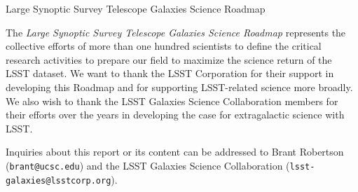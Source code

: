 \documentclass[11pt,fleqn,oneside,openany]{book}
\begin{document}



\thispagestyle{empty}
{\Huge Large Synoptic Survey Telescope} 
\linebreak 
\linebreak 
{\Huge Galaxies Science Roadmap}
\linebreak
\linebreak
{\centering

}
\vfill

\newpage
\thispagestyle{empty}

\noindent
{\justify
The {\it Large Synoptic Survey Telescope Galaxies Science Roadmap} represents the collective efforts of more than one hundred scientists to define the critical research activities to prepare our field to maximize
the science return of the LSST dataset. We want to thank the LSST Corporation for their
support in developing this Roadmap and for supporting LSST-related science more broadly.
We also wish to thank the LSST Galaxies Science Collaboration members for their efforts
over the years in developing the case for extragalactic science with LSST. 
}
\vspace{1in}

Inquiries about this report or its content can be addressed to Brant Robertson ({\tt brant@ucsc.edu}) and the LSST Galaxies Science Collaboration ({\tt lsst-galaxies@lsstcorp.org}).
\vspace{1in}







\tableofcontents %










\end{document}
